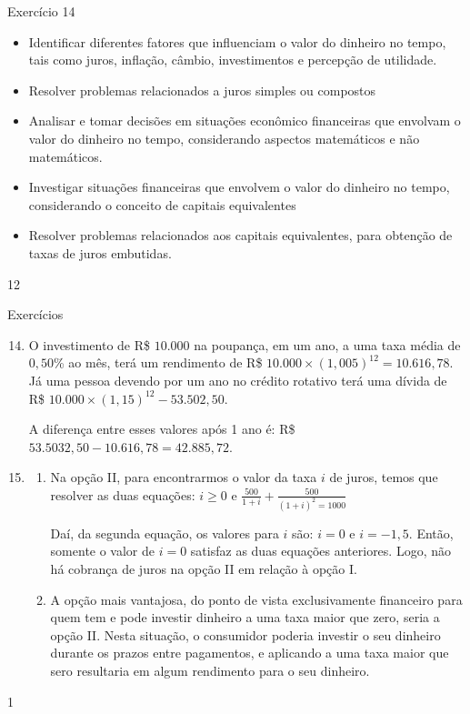 \begin{objectives}{Exercício 14}
{
  \begin{itemize}
  \item Identificar diferentes fatores que influenciam o valor do dinheiro no tempo, tais como juros, inflação, câmbio, investimentos e percepção de utilidade.
  \item Resolver problemas relacionados a juros simples ou compostos
  \item Analisar e tomar decisões em situações econômico financeiras que envolvam o valor do dinheiro no tempo, considerando aspectos matemáticos e não matemáticos.
  \end{itemize}


  \begin{itemize}
  \item Investigar situações financeiras que envolvem o valor do dinheiro no tempo, considerando o conceito de capitais equivalentes 
  \item Resolver problemas relacionados aos capitais equivalentes, para obtenção de taxas de juros embutidas.
  \end{itemize}
}{1}{2}
\end{objectives}
\begin{answer}{Exercícios}
{\exerciselist

  \begin{enumerate}\setcounter{enumi}{13}
    \item O investimento de R\$ $10.000$ na poupança, em um ano, a uma taxa média de $0{,}50$\% ao mês, terá um rendimento de R\$ $10.000\times (1{,}005)^12=10.616{,}78$. Já uma pessoa devendo por um ano no crédito rotativo terá uma dívida de R\$ $10.000\times(1{,}15)^12-53.502{,}50$.

    A diferença entre esses valores após 1 ano é: R\$ $53.5032{,}50-10.616{,}78=42.885{,}72$. 

    \item
    \begin{enumerate}
      \item Na opção II, para encontrarmos o valor da taxa $i$ de juros, temos que resolver as duas equações: $i\geq0$ e $\displaystyle\frac{500}{1+i}+\frac{500}{(1+i)^2=1000}$

      Daí, da segunda equação, os valores para $i$ são: $i=0$ e $i=-1{,}5$. Então, somente o valor de $i=0$ satisfaz as duas equações anteriores. Logo, não há cobrança de juros na opção II em relação à opção I.

      \item A opção mais vantajosa, do ponto de vista exclusivamente financeiro para quem tem e pode investir dinheiro a uma taxa  maior que zero, seria a opção II. Nesta situação, o consumidor poderia investir o seu dinheiro durante os prazos entre pagamentos, e aplicando a uma taxa maior que sero resultaria em algum rendimento para o seu dinheiro.
    \end{enumerate}
  \end{enumerate}
}{1}
\end{answer}
\clearmargin

